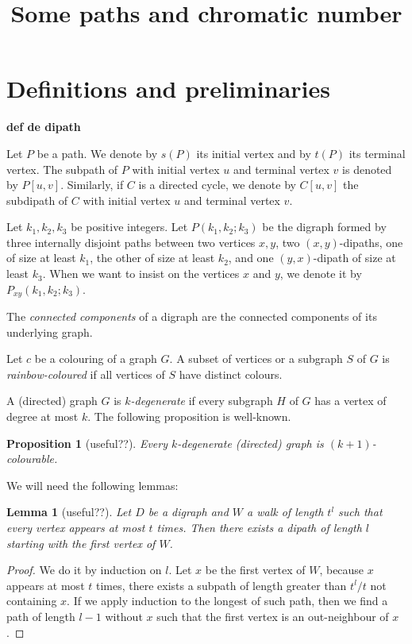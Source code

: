 \documentclass[utf8,10pt]{article}
\title{Some paths and chromatic number}
\theoremstyle{plain}
\newtheorem{lemma}[theorem]{Lemma}
\newtheorem{proposition}[theorem]{Proposition}
\theoremstyle{definition}
\theoremstyle{remark}
\begin{document}
\maketitle

\section{Definitions and preliminaries}

{\bf def de dipath}

Let $P$ be a path. We denote by $s(P)$ its initial vertex and by $t(P)$ its terminal vertex.
The subpath of $P$ with initial vertex $u$ and terminal vertex $v$ is denoted by $P[u,v]$.
Similarly, if $C$ is a directed cycle, we denote by $C[u,v]$ the subdipath of $C$ with initial vertex $u$ and terminal vertex $v$.


Let $k_1,k_2,k_3$ be positive integers. Let $P(k_1,k_2;k_3)$ be the digraph formed by three internally disjoint paths between two vertices $x,y$, two $(x,y)$-dipaths, one of size at least $k_1$, the other of size at least $k_2$, and one $(y,x)$-dipath of size at least $k_3$.
When we want to insist on the vertices $x$ and $y$, we denote it by $P_{xy}(k_1,k_2;k_3)$.


The {\it connected components} of a digraph are the connected components of its underlying graph.

Let $c$ be a colouring of a graph $G$. A subset of vertices or a subgraph $S$ of $G$ is {\it rainbow-coloured} if all vertices of $S$ have distinct colours.


A (directed) graph $G$ is {\it $k$-degenerate} if every subgraph $H$ of $G$ has a vertex of degree at most $k$.
The following proposition is well-known.
\begin{proposition}[useful??]\label{prop:deg}
Every $k$-degenerate (directed) graph is $(k+1)$-colourable.
\end{proposition}





We will need the following lemmas:

\begin{lemma}[useful??]\label{walk}
Let $D$ be a digraph and $W$ a walk of length $t^l$ such that every vertex appears at most $t$ times.
Then there exists a dipath of length $l$ starting with the first vertex of $W$.
\end{lemma}

\begin{proof}
We do it by induction on $l$. Let $x$ be the first vertex of $W$, because $x$ appears at most $t$ times, there exists a subpath of length greater
than $t^l/t$ not containing $x$. If we apply induction to the longest of such path, then we find a path of length $l-1$ without $x$ such that
 the first vertex is an out-neighbour of $x$.

\end{proof}
\end{document}
